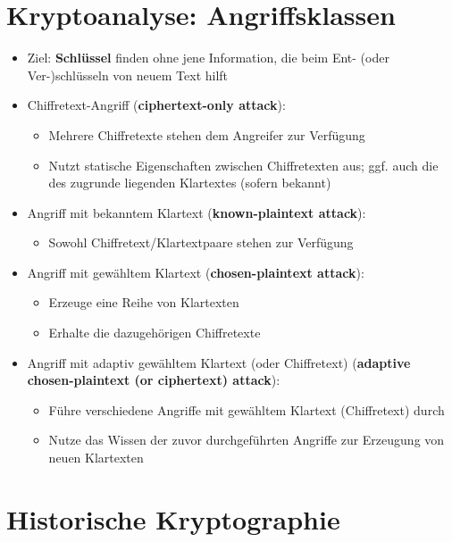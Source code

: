 \documentclass[openany]{book}
\begin{document}
\section{Kryptoanalyse: Angriffsklassen}

\begin{itemize}
    \item Ziel: \textbf{Schlüssel} finden ohne jene Information, die beim Ent- (oder Ver-)schlüsseln von neuem Text hilft
    \item Chiffretext-Angriff (\textbf{ciphertext-only attack}):
    \begin{itemize}
        \item Mehrere Chiffretexte stehen dem Angreifer zur Verfügung
        \item Nutzt statische Eigenschaften zwischen Chiffretexten aus; ggf. auch die des zugrunde liegenden Klartextes (sofern bekannt)
    \end{itemize} 
    \item Angriff mit bekanntem Klartext (\textbf{known-plaintext attack}):
    \begin{itemize}
        \item Sowohl Chiffretext/Klartextpaare stehen zur Verfügung
    \end{itemize}
    \item Angriff mit gewähltem Klartext (\textbf{chosen-plaintext attack}):
    \begin{itemize}
        \item Erzeuge eine Reihe von Klartexten
        \item Erhalte die dazugehörigen Chiffretexte
    \end{itemize}
    \item Angriff mit adaptiv gewähltem Klartext (oder Chiffretext) (\textbf{adaptive chosen-plaintext (or ciphertext) attack}):
    \begin{itemize}
        \item Führe verschiedene Angriffe mit gewähltem Klartext (Chiffretext) durch
        \item Nutze das Wissen der zuvor durchgeführten Angriffe zur Erzeugung von neuen Klartexten
    \end{itemize}
\end{itemize}

\newpage

\section{Historische Kryptographie}
\end{document}
